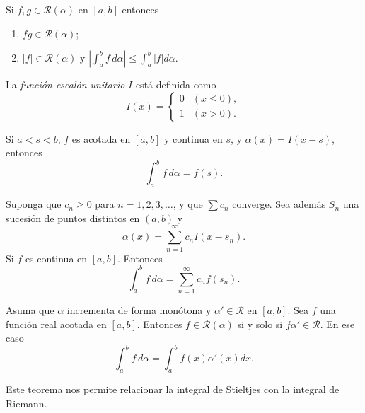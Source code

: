 \documentclass[10pt]{beamer}
\begin{document}
\begin{frame}[allowframebreaks]

\begin{theorem}[9]
Si $f, g \in \mathcal{R}(\alpha)$ en $[a, b]$ entonces
\begin{enumerate}
	\item $fg \in \mathcal{R}(\alpha)$;
	\item $|f| \in \mathcal{R}(\alpha)$ y $\left|\int_a^b f\,d\alpha\right| \leq \int_a^b |f| d\alpha$.
\end{enumerate}
\end{theorem}

\begin{definition}
La \textit{función escalón unitario} $I$ está definida como
\[
	I(x) = \begin{cases}
		0 & (x \leq 0),\\
		1 & (x > 0).
	\end{cases}
\]
\end{definition}

\begin{theorem}
Si $a < s < b$, $f$ es acotada en $[a, b]$ y continua en $s$, y $\alpha(x) = I(x-s)$, entonces
\[
	\int_a^b f\,d\alpha = f(s).
\]
\end{theorem}

\begin{theorem}
Suponga que $c_n \geq 0$ para $n = 1, 2, 3, \dots$, y que $\sum c_n$ converge. Sea además ${S_n}$ una sucesión de puntos distintos en $(a, b)$ y
\begin{equation}
	\alpha(x) = \sum_{n=1}^{\infty} c_n I(x-s_n).
\end{equation}
Si $f$ es continua en $[a, b]$. Entonces
\begin{equation}
	\int_a^b f\,d\alpha = \sum_{n=1}^{\infty} c_n f(s_n).
\end{equation}
\end{theorem}

\begin{theorem}
Asuma que $\alpha$ incrementa de forma monótona  y $\alpha' \in \mathcal{R}$ en $[a, b]$. Sea $f$ una función real acotada en $[a, b]$.
Entonces $f \in \mathcal{R}(\alpha)$ si y solo si $f\alpha' \in \mathcal{R}$. En ese caso
\begin{equation}
	\int_a^b f\,d\alpha = \int_a^b f(x)\alpha'(x) dx.
\end{equation}
\end{theorem}

Este teorema nos permite relacionar la integral de Stieltjes con la integral de Riemann.


\end{frame}
\end{document}

